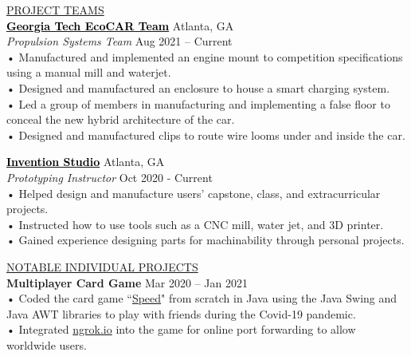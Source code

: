 \documentclass{article}
\begin{document}
\underline{\Large P\normalsize ROJECT TEAMS\qquad\qquad\qquad\qquad\qquad\qquad\qquad\qquad\qquad\qquad\qquad\qquad\qquad\qquad\qquad\qquad\qquad\qquad\qquad\qquad\quad}\\                     

\large\textbf{\href{https://ecocarevchallenge.org/}{\textcolor{black}{Georgia Tech EcoCAR Team}}}    \hfill Atlanta, GA\\
\large\textit{Propulsion Systems Team} \hfill Aug 2021 – Current\\
\qquad • \quad Manufactured and implemented an engine mount to competition specifications\\
\qquad  \qquad using a manual mill and waterjet.\\
\qquad • \quad Designed and manufactured an enclosure to house a smart charging system.\\
\qquad • \quad Led a group of members in manufacturing and implementing a false floor to\\
\qquad  \qquad conceal the new hybrid architecture of the car.\\
\qquad • \quad Designed and manufactured clips to route wire looms under and inside the car.\\
\vspace{3mm} %

\large\textbf{\href{https://inventionstudio.gatech.edu/}{\textcolor{black}{Invention Studio}}} \hfill Atlanta, GA\\
\large \textit{Prototyping Instructor} \hfill Oct 2020 - Current\\
\qquad • \quad Helped design and manufacture users’ capstone, class, and extracurricular projects.\\  %
\qquad • \quad Instructed how to use tools such as a CNC mill, water jet, and 3D printer.\\
\qquad • \quad Gained experience designing parts for machinability through personal projects.\\
\vspace{3mm} %



\underline{\Large N\normalsize OTABLE INDIVIDUAL PROJECTS\qquad\qquad\qquad\qquad\qquad\qquad\qquad\qquad\qquad\qquad\qquad\qquad\qquad\qquad\qquad\qquad\quad}\\ 

\large\textbf{Multiplayer Card Game} \hfill Mar 2020 – Jan 2021\\
\qquad • \quad Coded the card game \textquotedblleft\href{https://www.instructables.com/How-to-Play-Speed-With-Cards/}{Speed}" from scratch in Java using the Java Swing and \\
\qquad  \qquad Java AWT libraries to play with friends during the Covid-19 pandemic.\\
\qquad • \quad Integrated \href{https://ngrok.com/}{ngrok.io} into the game for online port forwarding to allow worldwide users.\\
\vspace{3mm} %
\end{document}
